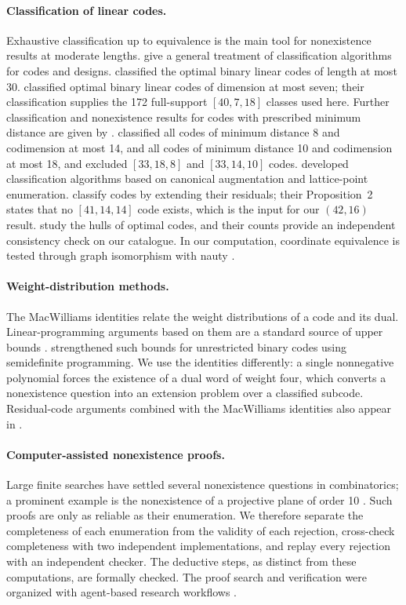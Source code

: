\paragraph{Classification of linear codes.}
Exhaustive classification up to equivalence is the main tool for nonexistence results at moderate lengths. \citet{kaski2006} give a general treatment of classification algorithms for codes and designs. \citet{jaffe2000} classified the optimal binary linear codes of length at most 30. \citet{bouyukliev2001} classified optimal binary linear codes of dimension at most seven; their classification supplies the 172 full-support $[40,7,18]$ classes used here. Further classification and nonexistence results for codes with prescribed minimum distance are given by \citet{feulner2014}. \citet{bouyukliev2011} classified all codes of minimum distance 8 and codimension at most 14, and all codes of minimum distance 10 and codimension at most 18, and excluded $[33,18,8]$ and $[33,14,10]$ codes. \citet{bouyukliev2021} developed classification algorithms based on canonical augmentation and lattice-point enumeration. \citet{bouyuklieva2020} classify codes by extending their residuals; their Proposition~2 states that no $[41,14,14]$ code exists, which is the input for our $(42,16)$ result. \citet{bouyuklieva2025} study the hulls of optimal codes, and their counts provide an independent consistency check on our catalogue. In our computation, coordinate equivalence is tested through graph isomorphism with nauty \citep{mckay2014}.

\paragraph{Weight-distribution methods.}
The MacWilliams identities \citep{macwilliams1963} relate the weight distributions of a code and its dual. Linear-programming arguments based on them are a standard source of upper bounds \citep{macwilliams1977}. \citet{schrijver2005} strengthened such bounds for unrestricted binary codes using semidefinite programming. We use the identities differently: a single nonnegative polynomial forces the existence of a dual word of weight four, which converts a nonexistence question into an extension problem over a classified subcode. Residual-code arguments combined with the MacWilliams identities also appear in \citet{kurz2021}.

\paragraph{Computer-assisted nonexistence proofs.}
Large finite searches have settled several nonexistence questions in combinatorics; a prominent example is the nonexistence of a projective plane of order 10 \citep{lam1989}. Such proofs are only as reliable as their enumeration. We therefore separate the completeness of each enumeration from the validity of each rejection, cross-check completeness with two independent implementations, and replay every rejection with an independent checker. The deductive steps, as distinct from these computations, are formally checked. The proof search and verification were organized with agent-based research workflows \citep{yang2026aris,mathrsi}.
